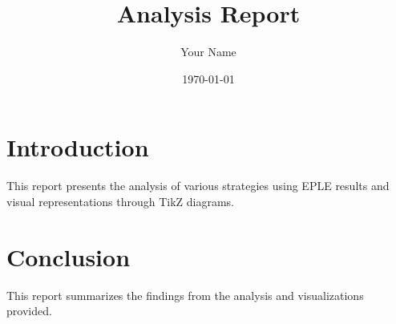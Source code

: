 \documentclass{article}
\title{Analysis Report}
\author{Your Name}
\date{\today}
\begin{document}
\maketitle

\section{Introduction}
This report presents the analysis of various strategies using EPLE results and visual representations through TikZ diagrams.




\section{Conclusion}
This report summarizes the findings from the analysis and visualizations provided.
\end{document}

